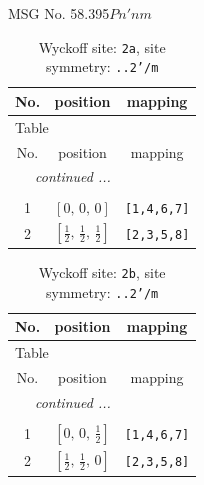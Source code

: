 \documentclass[fleqn,8pt]{jsarticle}
\begin{document}
\setcounter{MaxMatrixCols}{32}

\renewcommand{\tablename}{Table~}
\renewcommand{\figurename}{Figure~}
\begin{center}
\LARGE
MSG No. 58.395\quad$Pn'nm$
\end{center}
\renewcommand{\arraystretch}{1.2}
\begin{longtable}{ccc}
\caption{Wyckoff site: {\tt 2a}, site symmetry: {\tt ..2'/m}}
 \\
 \hline \hline
No. & position & mapping \\ \hline \endfirsthead

\multicolumn{2}{l}{\tablename\ \thetable{}} \\
 \hline \hline
No. & position & mapping \\ \hline \endhead

 \hline \hline
\multicolumn{2}{r}{\footnotesize\it continued ...} \\ \endfoot

 \hline \hline
\multicolumn{2}{r}{} \\ \endlastfoot

1 & $\left[ 0,\, 0,\, 0 \right]$ & {\tt [1,4,6,7]} \\ \hline
2 & $\left[ \frac{1}{2},\, \frac{1}{2},\, \frac{1}{2} \right]$ & {\tt [2,3,5,8]} \\
\end{longtable}
\renewcommand{\arraystretch}{1.2}
\begin{longtable}{ccc}
\caption{Wyckoff site: {\tt 2b}, site symmetry: {\tt ..2'/m}}
 \\
 \hline \hline
No. & position & mapping \\ \hline \endfirsthead

\multicolumn{2}{l}{\tablename\ \thetable{}} \\
 \hline \hline
No. & position & mapping \\ \hline \endhead

 \hline \hline
\multicolumn{2}{r}{\footnotesize\it continued ...} \\ \endfoot

 \hline \hline
\multicolumn{2}{r}{} \\ \endlastfoot

1 & $\left[ 0,\, 0,\, \frac{1}{2} \right]$ & {\tt [1,4,6,7]} \\ \hline
2 & $\left[ \frac{1}{2},\, \frac{1}{2},\, 0 \right]$ & {\tt [2,3,5,8]} \\
\end{longtable}
\end{document}
